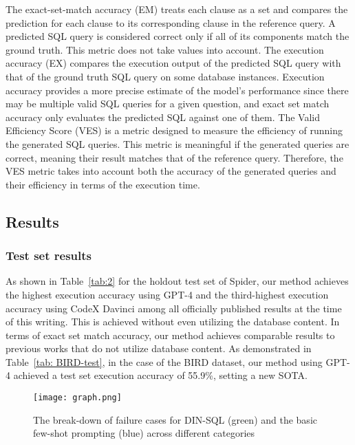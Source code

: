 The exact-set-match accuracy (EM) treats each clause as a set and compares the prediction for each clause to its corresponding clause in the reference query. A predicted SQL query is considered correct only if all of its components match the ground truth. This metric does not take values into account.
The execution accuracy (EX) compares the execution output of the predicted SQL query with that of the ground truth SQL query on some database instances. Execution accuracy provides a more precise estimate of the model's performance since there may be multiple valid SQL queries for a given question, and exact set match accuracy only evaluates the predicted SQL against one of them. The Valid Efficiency Score (VES) is a metric designed to measure the efficiency of running the generated SQL queries. This metric is meaningful if the generated queries are correct, meaning their result matches that of the reference query.
Therefore, the VES metric takes into account both the accuracy of the generated queries and their efficiency in terms of the execution time.

\subsection{Results}
\subsubsection{Test set results} 

As shown in Table~\ref{tab:2} for the holdout test set of Spider, our method achieves the highest execution accuracy using GPT-4 and the third-highest execution accuracy using CodeX Davinci among all officially published results at the time of this writing. This is achieved without even utilizing the database content. %
In terms of exact set match accuracy, our method achieves comparable results to previous works that do not utilize database content. As demonstrated in Table~\ref{tab: BIRD-test}, in the case of the BIRD dataset, our method using GPT-4 achieved a test set execution accuracy of 55.9\%, setting a new SOTA.

\begin{wrapfigure}{r}{0.5\textwidth}
  \centering
  \texttt{[image: graph.png]}
  \caption{The break-down of failure cases for DIN-SQL (green) and the basic few-shot prompting (blue) across different categories}
  \label{fig:6}
\end{wrapfigure}


